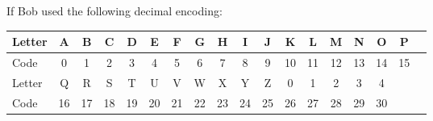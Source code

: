 \documentclass[12pt,emtex]{article}
\begin{document}
\begin{enumerate}
                \medskip
           
          \hspace{-10mm}   
             If Bob used the following decimal encoding:
          
          \hspace{-10mm}   
                \begin{tabular}{|l||c|c|c|c|c|c|c|c|c|c|c|c|c|c|c|c|c|} \hline
                  Letter  & \hspace{0.5mm}  A   \hspace{0.5mm} & \hspace{0.5mm} B \hspace{0.5mm} & \hspace{0.5mm} C \hspace{0.5mm}
                          & \hspace{0.5mm}  D   \hspace{0.5mm} & \hspace{0.5mm} E \hspace{0.5mm} & \hspace{0.5mm} F \hspace{0.5mm}
                          & \hspace{0.5mm}  G   \hspace{0.5mm} & \hspace{0.5mm} H \hspace{0.5mm} & \hspace{0.5mm} I \hspace{0.5mm}
                          & \hspace{0.5mm}  J   \hspace{0.5mm} & \hspace{0.5mm} K \hspace{0.5mm} & \hspace{0.5mm} L \hspace{0.5mm}
                          & \hspace{0.5mm}  M   \hspace{0.5mm} &  \hspace{0.5mm} N  \hspace{0.5mm}   &  \hspace{0.5mm}   O  \hspace{0.5mm} &  \hspace{0.5mm} P  \hspace{0.5mm} \\ \hline
                  Code  & 0   &   1   &   2   &   3   &   4   &   5   &   6   &   7   &   8   &   9   &   10  &   11  &   12 & 13  &   14 & 15  \\ \hline \hline
                  Letter     &   Q   &   R   &   S   &   T   &   U   &   V   &   W   &   X   &   Y   &   Z & 0 & 1& 2& 3 & 4 &  \\ \hline
                  Code    &   16  &   17  &   18  &   19  &   20  &   21  &   22  &   23  &   24  &   25 & 26 & 27 & 28 & 29 & 30 & \\ \hline
                \end{tabular}
    

\end{enumerate}
\end{document}
